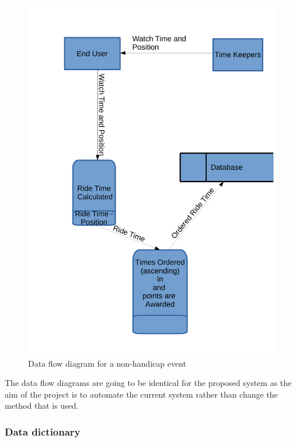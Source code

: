 \begin{figure}
	\includegraphics[width=\textwidth]{./Non-HandicapDFD-PS.pdf}
	\caption{Data flow diagram for a non-handicap event}
\end{figure}

The data flow diagrams are going to be identical for the proposed system as the aim of the project is to automate the current system rather than change the method that is used.


\subsubsection{Data dictionary}


